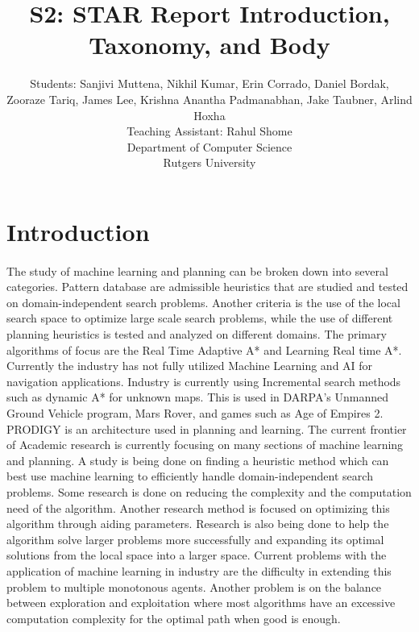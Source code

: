 \documentclass[tog]{acmsiggraph}
\title{S2: STAR Report Introduction, Taxonomy, and Body}
\author{Students: %
 Sanjivi Muttena\emailfoot{sm1727@scarletmail.rutgers.edu}, %
 Nikhil Kumar\emailfoot{nikhilkumar516@gmail.com}, %
 Erin Corrado\emailfoot{e.corrado144@gmail.com}, %
 Daniel Bordak\emailfoot{dbordak@fastmail.fm},%
 \\Zooraze Tariq\emailfoot{zooraze@gmail.com}, %
 James Lee\emailfoot{yl50@scarletmail.rutgers.edu}, %
 Krishna Anantha Padmanabhan\emailfoot{krishna.ananth@rutgers.edu}, %
 Jake Taubner\emailfoot{jdt97@scarletmail.rutgers.edu}, %
 Arlind Hoxha\emailfoot{ah621@scarletmail.rutgers.edu}%
 \\Teaching Assistant: Rahul Shome\emailfoot{rahulshome.in@gmail.com}%
 \\Department of Computer Science%
 \\Rutgers University}
\begin{document}
\maketitle


\begin{abstract}

\paragraph{}



\end{abstract}


\keywordlist


\section{Introduction}

\paragraph{}
	The study of machine learning and planning can be broken down into several categories. Pattern database are admissible heuristics that are studied and tested on domain-independent search problems. Another criteria is the use of the local search space to optimize large scale search problems, while the use of different planning heuristics is tested and analyzed on different domains. The primary algorithms of focus are the Real Time Adaptive A* and Learning Real time A*. Currently the industry has not fully utilized Machine Learning and AI for navigation applications. Industry is currently using Incremental search methods such as dynamic A* for unknown maps. This is used in DARPA’s Unmanned Ground Vehicle program, Mars Rover, and games such as Age of Empires 2. PRODIGY is an architecture used in planning and learning. The current frontier of Academic research is currently focusing on many sections of machine learning and planning. A study is being done on finding a heuristic method which can best use machine learning to efficiently handle domain-independent search problems. Some research is done on reducing the complexity and the computation need of the algorithm. Another research method is focused on optimizing this algorithm through aiding parameters. Research is also being done to help the algorithm solve larger problems more successfully and expanding its optimal solutions from the local space into a larger space. Current problems with the application of machine learning in industry are the difficulty in extending this problem to multiple monotonous agents. Another problem is on the balance between exploration and exploitation where most algorithms have an excessive computation complexity for the optimal path when good is enough.    


\end{document}
